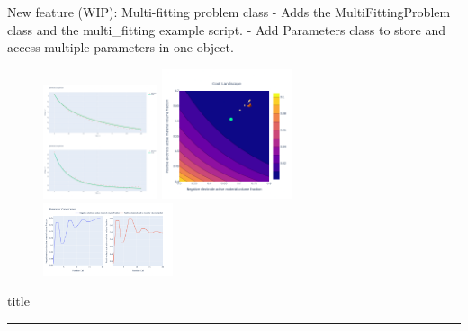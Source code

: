 \documentclass[aspectratio=169]{beamer}
\begin{document}
\begin{frame}[fragile,t]{New feature (WIP): Multi-fitting problem class}
    \vspace{-6mm}
     - Adds the MultiFittingProblem class and the multi\_fitting example script.
     - Add Parameters class to store and access multiple parameters in one object.

    \vspace{-2mm}
    \begin{figure}
        \centering
        \includegraphics[width=0.3\textwidth]{Images/Highlights/multi_data_fitting.png}
        \includegraphics[width=0.34\textwidth]{Images/Highlights/multi_cost.png}
        \includegraphics[width=0.34\textwidth]{Images/Highlights/multi_parameters.png}
        \label{fig:MultiFitting}
    \end{figure}
\end{frame}

\begin{frame}[plain]
    \centering
    \begin{beamercolorbox}[sep=8pt,center,shadow=true,rounded=true]{title}
    \par%
    \color{oxfordblue}\noindent\rule{10cm}{1pt} \\
    \end{beamercolorbox}
\end{frame}
\end{document}
